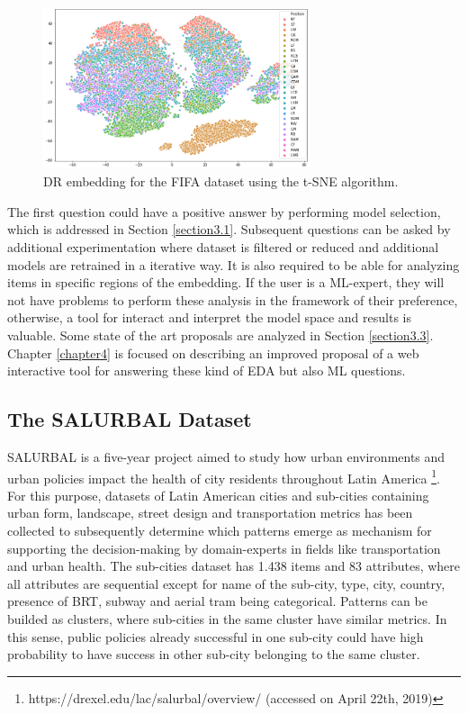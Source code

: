 \begin{figure}[ht]
 \centering
 \includegraphics[width=0.7\textwidth]{fifa-tsne.png}
 \caption{DR embedding for the FIFA dataset using the t-SNE algorithm.}
 \label{fig:fifa-tsne}
\end{figure}

The first question could have a positive answer by performing model selection, which is addressed in Section \ref{section3.1}. Subsequent questions can be asked by additional experimentation where dataset is filtered or reduced and additional models are retrained in a iterative way. It is also required to be able for analyzing items in specific regions of the embedding. If the user is a ML-expert, they will not have problems to perform these analysis in the framework of their preference, otherwise, a tool for interact and interpret the model space and results is valuable. Some state of the art proposals are analyzed in Section \ref{section3.3}. Chapter \ref{chapter4} is focused on describing an improved proposal of a web interactive tool for answering these kind of EDA but also ML questions.

\subsection{The SALURBAL Dataset}
\label{subsection1.1.2}

SALURBAL is a five-year project aimed to study how urban environments and urban policies impact the health of city residents throughout Latin America \footnote{https://drexel.edu/lac/salurbal/overview/ (accessed on April 22th, 2019)}. For this purpose, datasets of Latin American cities and sub-cities containing urban form, landscape, street design and transportation metrics has been collected to subsequently determine which patterns emerge as mechanism for supporting the decision-making by domain-experts in fields like transportation and urban health. The sub-cities dataset has 1.438 items and 83 attributes, where all attributes are sequential except for name of the sub-city, type, city, country, presence of BRT, subway and aerial tram being categorical. Patterns can be builded as clusters, where sub-cities in the same cluster have similar metrics. In this sense, public policies already successful in one sub-city could have high probability to have success in other sub-city belonging to the same cluster. 

